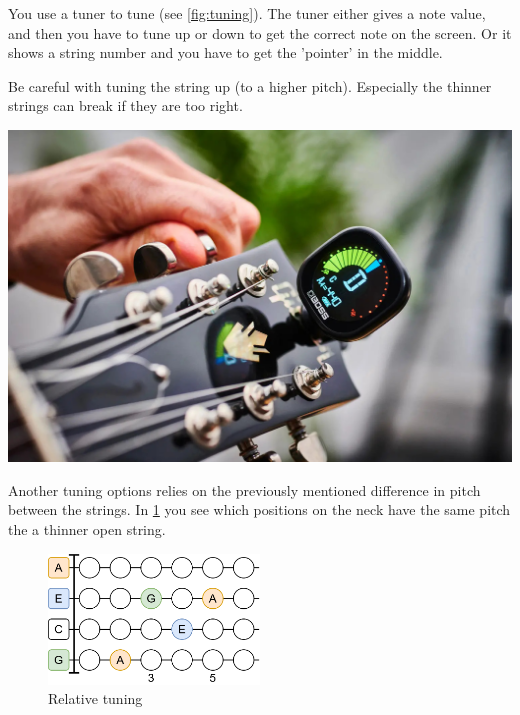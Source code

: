 \begin{minipage}{0.5\textwidth}
You use a tuner to tune (see \ref{fig:tuning}). The tuner either gives a note value, and then you have to tune up or down to get the correct note on the screen. Or it shows a string number and you have to get the 'pointer' in the middle.

Be careful with tuning the string up (to a higher pitch). Especially the thinner strings can break if they are too right.
\end{minipage}
\hfill
\begin{minipage}{0.34\textwidth}
	\centering
	\includegraphics[width=\textwidth]{../Images/guitar-tuning.jpg}
	\label{fig:tuning}
\end{minipage}

Another tuning options relies on the previously mentioned difference in pitch between the strings. In \ref{fig:ukulele_relative_tuning} you see which positions on the neck have the same pitch the a thinner open string.

\begin{figure}[h]
	\centering
	\includegraphics[width=0.5\textwidth]{../Images/UkuleleRelativeTuning.png}
	\caption{Relative tuning}
	\label{fig:ukulele_relative_tuning}
\end{figure}
